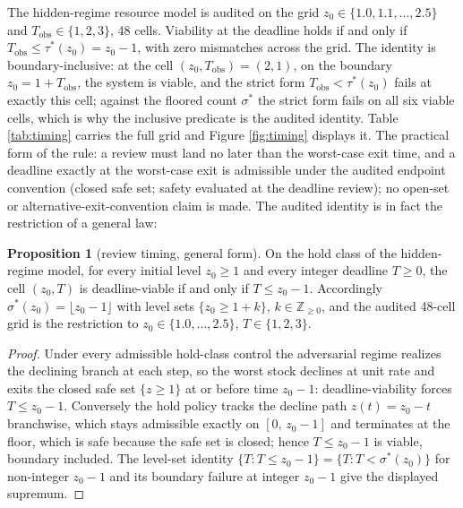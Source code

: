 \documentclass[10pt,twocolumn]{article}
\theoremstyle{definition}
\newtheorem{proposition}{Proposition}
\begin{document}
The hidden-regime resource model is audited on the grid
\(z_0 \in \{1.0, 1.1, \dots, 2.5\}\) and
\(T_{\mathrm{obs}} \in \{1, 2, 3\}\), 48 cells. Viability at the
deadline holds if and only if
\(T_{\mathrm{obs}} \le \tau^{*}(z_0) = z_0 - 1\), with zero
mismatches across the grid. The identity is boundary-inclusive: at the
cell \((z_0, T_{\mathrm{obs}}) = (2, 1)\), on the boundary
\(z_0 = 1 + T_{\mathrm{obs}}\), the system is viable, and the strict form \(T_{\mathrm{obs}} <
\tau^{*}(z_0)\) fails at exactly this cell; against the floored count
\(\sigma^{*}\) the strict form fails on all six viable cells, which is
why the inclusive predicate is the audited identity.
Table \ref{tab:timing} carries the full grid and Figure
\ref{fig:timing} displays it. The practical form of the rule: a review
must land no later than the worst-case exit time, and a deadline exactly at the worst-case exit is admissible under the audited endpoint convention (closed safe set; safety evaluated at the deadline review); no open-set or alternative-exit-convention claim is made. The audited identity is in fact the
restriction of a general law:

\begin{proposition}[review timing, general form]\label{prop:timing}
On the hold class of the hidden-regime model, for every initial level
\(z_0 \ge 1\) and every integer deadline \(T \ge 0\), the cell
\((z_0, T)\) is deadline-viable if and only if \(T \le z_0 - 1\).
Accordingly \(\sigma^{*}(z_0) = \lfloor z_0 - 1 \rfloor\) with level
sets \(\{z_0 \ge 1 + k\}\), \(k \in \mathbb{Z}_{\ge 0}\), and the
audited 48-cell grid is the restriction to \(z_0 \in \{1.0, \dots,
2.5\}\), \(T \in \{1, 2, 3\}\).
\end{proposition}

\begin{proof}
Under every admissible hold-class control the adversarial regime realizes
the declining branch at each step, so the worst stock declines at unit
rate and exits the closed safe set \(\{z \ge 1\}\) at or before time
\(z_0 - 1\): deadline-viability forces \(T \le z_0 - 1\). Conversely
the hold policy tracks the decline path \(z(t) = z_0 - t\) branchwise,
which stays admissible exactly on \([0,\, z_0 - 1]\) and terminates at
the floor, which is safe because the safe set is closed; hence
\(T \le z_0 - 1\) is viable, boundary included. The level-set identity
\(\{T : T \le z_0 - 1\} = \{T : T < \sigma^{*}(z_0)\}\) for
non-integer \(z_0 - 1\) and its boundary failure at integer
\(z_0 - 1\) give the displayed supremum.
\end{proof}
\end{document}
